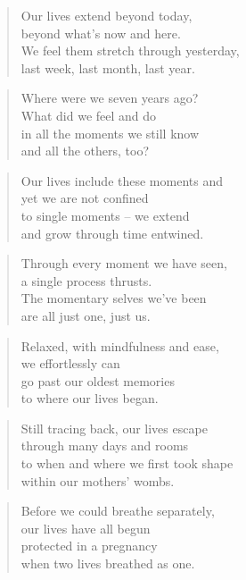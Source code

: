\documentclass[10pt,a4paper]{article}
\begin{document}
\begin{paracol}{2}
\begin{verse}
Our lives extend beyond today,\\
beyond what’s now and here.\\
We feel them stretch through yesterday,\\
last week, last month, last year.
\end{verse}

\begin{verse}
Where were we seven years ago?\\
What did we feel and do\\
in all the moments we still know\\
and all the others, too?
\end{verse}

\begin{verse}
Our lives include these moments and\\
yet we are not confined\\
to single moments – we extend\\
and grow through time entwined.
\end{verse}

\begin{verse}
Through every moment we have seen,\\
a single process thrusts.\\
The momentary selves we’ve been\\
are all just one, just us.
\end{verse}

\begin{verse}
Relaxed, with mindfulness and ease,\\
we effortlessly can\\
go past our oldest memories\\
to where our lives began.
\end{verse}

\begin{verse}
Still tracing back, our lives escape\\
through many days and rooms\\
to when and where we first took shape\\
within our mothers’ wombs.
\end{verse}

\begin{verse}
Before we could breathe separately,\\
our lives have all begun\\
protected in a pregnancy\\
when two lives breathed as one.
\end{verse}


\end{paracol}
\end{document}
